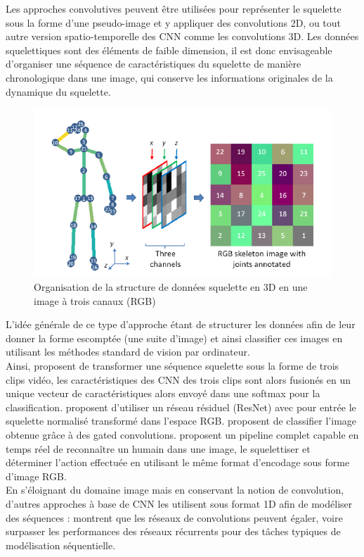 Les approches convolutives peuvent être utilisées pour représenter le squelette sous la forme d'une pseudo-image et y appliquer des convolutions 2D, ou tout autre version spatio-temporelle des CNN comme les convolutions 3D. Les données squelettiques sont des éléments de faible dimension, il est donc envisageable d'organiser une séquence de caractéristiques du squelette de manière chronologique dans une image, qui conserve les informations originales de la dynamique du squelette.

\begin{figure}[H]
    \centering
    \includegraphics[width=0.5\linewidth]{Images/skeltoim.png}
    \caption{Organisation de la structure de données squelette en 3D en une image à trois canaux (RGB)}
    \label{fig:skeltoim}
\end{figure}
L’idée générale de ce type d'approche étant de structurer les données afin de leur donner la forme escomptée (une suite d’image) et ainsi classifier ces images en utilisant les méthodes standard de vision par ordinateur.\\


Ainsi, \cite{ke2017new} proposent de transformer une séquence squelette sous la forme de trois clips vidéo, les caractéristiques des CNN des trois clips sont alors fusionés en un unique vecteur de caractéristiques alors envoyé dans une softmax pour la classification.
\cite{pham2018learning} proposent d'utiliser un réseau résiduel (ResNet) \cite{he2016deep} avec pour entrée le squelette normalisé transformé dans l'espace RGB.
\cite{cao2018skeleton} proposent de classifier l'image obtenue grâce à des gated convolutions.
\cite{ludl2019simple} proposent un pipeline complet capable en temps réel de reconnaître un humain dans une image, le squelettiser et déterminer l'action effectuée en utilisant le même format d'encodage sous forme d'image RGB.\\

En s'éloignant du domaine image mais en conservant la notion de convolution, d'autres approches à base de CNN les utilisent sous format 1D afin de modéliser des séquences :
\cite{bai2018empirical} montrent que les réseaux de convolutions peuvent égaler, voire surpasser les performances des réseaux récurrents pour des tâches typiques de modélisation séquentielle.\\

